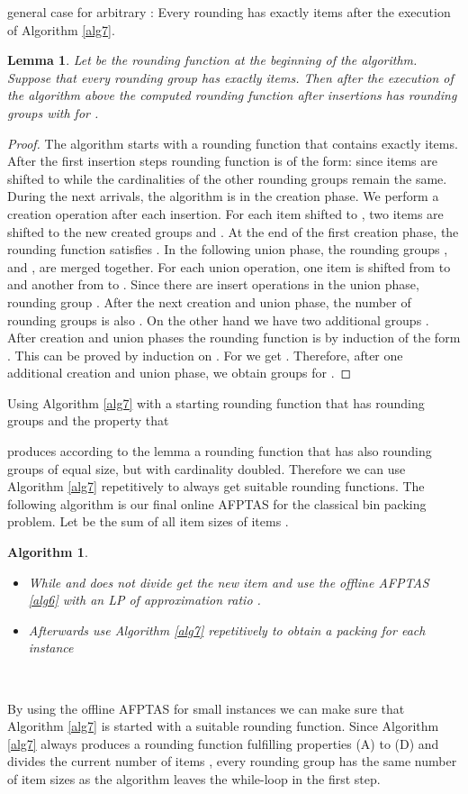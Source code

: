 \documentclass[a4paper,11pt]{article}
\newtheorem{lem}[thm]{Lemma}
\newtheorem{algo}{Algorithm}
\begin{document}
general case for arbitrary : Every rounding has exactly  items after the execution of Algorithm \ref{alg7}.
\begin{lem}\label{lem13}
	Let  be the rounding function at the beginning of the algorithm. Suppose that every 
	rounding group		has exactly  items.
	Then after the execution of the algorithm above the computed rounding function  after  insertions
	has  rounding groups  with  for . 
\end{lem}
\begin{proof}
	The algorithm starts with a rounding function that contains exactly  items. After the first  insertion steps
	rounding function  is of the form:
	 since  items are shifted to   while the cardinalities 
	of the other rounding groups remain the same.
	During the next  arrivals, the algorithm is in the creation phase. We perform a creation operation after
	each insertion. For each item shifted to , two items are shifted to the new created groups  and .
	At the end of the first creation
	phase, the rounding function  satisfies .
	In the following union phase, the rounding groups ,  and , 
	are merged together. For each union operation, one item is shifted from  to 
	and another from  to . Since there are  insert operations in the union phase,
	rounding group . 
	After the next creation and union phase, the number of rounding groups is also .
	On the other hand we have two additional groups .
	After  creation and union phases the rounding
	function  is by induction of the form . 
	This can be proved by induction on . For  we get .
	Therefore, after one additional creation and union phase, we obtain  groups  for
	.
\end{proof}
Using Algorithm \ref{alg7} with a starting rounding function  that has  rounding groups and the property that 

produces according to the lemma a rounding function  that has also  rounding groups of equal size,
but with cardinality doubled.
Therefore we can use Algorithm \ref{alg7} repetitively to always get suitable rounding functions.
The following algorithm is our final online AFPTAS for the classical bin packing problem. Let  be the sum
of all item sizes of items .
\begin{algo}\label{alg8}
\
\begin{itemize}
\item While  and  does not divide  get the new item  and
use the offline AFPTAS \ref{alg6} with an LP of approximation ratio .
\item Afterwards use Algorithm \ref{alg7} repetitively to obtain a packing for each instance
\end{itemize}
\
\end{algo}
By using the offline AFPTAS for small instances we can make sure that Algorithm \ref{alg7} is started with
a suitable rounding function. Since Algorithm \ref{alg7} always produces a rounding function fulfilling properties (A) to (D)
and  divides the current number of items , every rounding group  has the same
number of item sizes as the algorithm leaves the while-loop in the first step.
\end{document}
